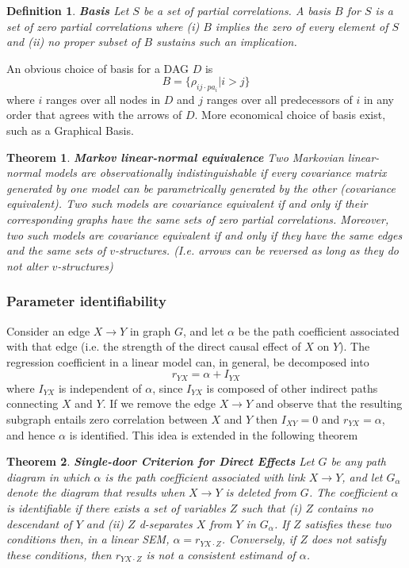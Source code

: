 \documentclass[11pt]{article}
\numberwithin{equation}{section}
\newtheorem{thm}{Theorem}[section]
\newtheorem{defn}{Definition}[section]
\begin{document}
\begin{defn}
\textbf{Basis} Let $S$ be a set of partial correlations. A basis $B$ for $S$ is a set of zero partial correlations where (i) $B$ implies the zero of every element of $S$ and (ii) no proper subset of $B$ sustains such an implication.
\end{defn}

An obvious choice of basis for a DAG $D$ is
\begin{equation}
B = \{\rho_{ij\cdot pa_{i}} | i>j \} 
\end{equation}
where $i$ ranges over all nodes in $D$ and $j$ ranges over all predecessors of $i$ in any order that agrees with the arrows of $D$. More economical choice of basis exist, such as a Graphical Basis. 

\begin{thm}
\textbf{Markov linear-normal equivalence} Two Markovian linear-normal models are observationally indistinguishable if every covariance matrix generated by one model can be parametrically generated by the other (covariance equivalent). Two such models are covariance equivalent if and only if their corresponding graphs have the same sets of zero partial correlations. Moreover, two such models are covariance equivalent if and only if they have the same edges and the same sets of $v$-structures. (I.e. arrows can be reversed as long as they do not alter $v$-structures)
\end{thm}

\subsubsection{Parameter identifiability}

Consider an edge $X \rightarrow Y$ in graph $G$, and let $\alpha$ be the path coefficient associated with that edge (i.e. the strength of the direct causal effect of $X$ on $Y$). The regression coefficient in a linear model can, in general, be decomposed into 
\begin{equation}
r_{YX} = \alpha + I_{YX}
\end{equation}
where $I_{YX}$ is independent of $\alpha$, since $I_{YX}$ is composed of other indirect paths connecting $X$ and $Y$. If we remove the edge $X \rightarrow Y$ and observe that the resulting subgraph entails zero correlation between $X$ and $Y$ then $I_{XY}=0$ and $r_{YX}=\alpha$, and hence $\alpha$ is identified. This idea is extended in the following theorem
\begin{thm}
\textbf{Single-door Criterion for Direct Effects} Let $G$ be any path diagram in which $\alpha$ is the path coefficient associated with link $X \rightarrow Y$, and let $G_\alpha$ denote the diagram that results when $X\rightarrow Y$ is deleted from $G$. The coefficient $\alpha$ is identifiable if there exists a set of variables $Z$ such that (i) $Z$ contains no descendant of $Y$ and (ii) $Z$ d-separates $X$ from $Y$ in $G_\alpha$. If $Z$ satisfies these two conditions then, in a linear SEM, $\alpha = r_{YX\cdot Z}$. Conversely, if $Z$ does not satisfy these conditions, then $r_{YX\cdot Z}$ is not a consistent estimand of $\alpha$. \label{thm:single-door-direct-effect}
\end{thm}
\end{document}
